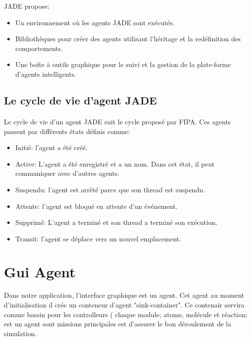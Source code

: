 JADE propose:
\begin{itemize}
    \item Un environnement où les agents JADE sont exécutés.
    \item Bibliothèques pour créer des agents utilisant l'héritage et la redéfinition des comportements.
    \item Une boîte à outils graphique pour le suivi et la gestion de la plate-forme d'agents intelligents.

\end{itemize}


\subsection{Le cycle de vie d'agent JADE}
\paragraph{}
Le cycle de vie d'un agent JADE suit le cycle proposé par FIPA. Ces agents passent par différents états définis comme:
\begin{itemize}

    \item Initié: l'agent a été créé.
    \item Active: L'agent a été enregistré et a un nom. Dans cet état, il peut communiquer avec d'autres agents.
    \item Suspendu: l'agent est arrêté parce que son thread est suspendu.
    \item Attente: l'agent est bloqué en attente d'un événement.
    \item Supprimé: L'agent a terminé et son thread a terminé son exécution.
    \item Transit: l'agent se déplace vers un nouvel emplacement.
\end{itemize}

\paragraph{}
\section{Gui Agent}
Dans notre application, l'interface graphique est un agent. Cet agent au moment d'initialisation il crée un conteneur d'agent "sink-container". Ce contenair servira comme bassin pour les controlleurs ( chaque module; atome, molécule et réaction; est un agent sont missions principales est d'assurer le bon déroulement de la simulation.


